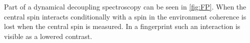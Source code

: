 Part of a dynamical decoupling spectroscopy can be seen in \cref{fig:FP}.
When the central spin interacts conditionally with a spin in the environment coherence is lost when the central spin is measured.
In a fingerprint such an interaction is visible as a lowered contrast.


\begin{figure}[htbp]

    \begin{subfigure}[t]{\textwidth}\centering
        \caption{}
        \label{fig:FP16}
    \end{subfigure}

    \begin{subfigure}[t]{\textwidth}\centering


\end{subfigure}
\end{figure}
